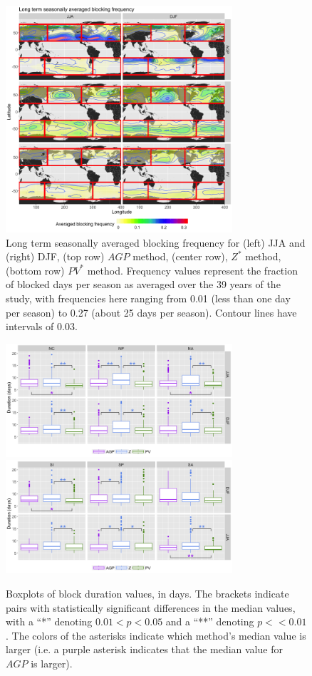 \documentclass[smallextended]{svjour3}       %
\numberwithin{equation}{section}
\begin{document}
\begin{figure}
\centering
\includegraphics[width=0.75\textwidth]{fig4}
\caption{Long term seasonally averaged blocking frequency for (left) JJA and (right) DJF, (top row) $AGP$ method, (center row), $Z^*$ method, (bottom row) $PV^*$ method. Frequency values represent the fraction of blocked days per season as averaged over the 39 years of the study, with frequencies here ranging from 0.01 (less than one day per season) to 0.27 (about 25 days per season). Contour lines have intervals of 0.03.}\label{blockdens} 
\end{figure}



\begin{figure}
    \centering
    \includegraphics[width=0.75\textwidth]{fig_duration_NH.png}
    \includegraphics[width=0.75\textwidth]{fig_duration_SH.png}
    \caption{Boxplots of block duration values, in days. The brackets indicate pairs with statistically significant differences in the median values, with a ``*'' denoting $0.01<p<0.05$ and a ``**'' denoting $p<<0.01$. The colors of the asterisks indicate which method's median value is larger (i.e. a purple asterisk indicates that the median value for $AGP$ is larger).}
    \label{duration}
\end{figure}
\end{document}
